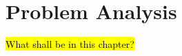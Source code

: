 \newpage
\section{Problem Analysis}

\iffalse
\hl{Content:}
\begin{itemize}
    \item \hl{continuing from Chapter 2 explain the issues}
    \item \hl{outline your solution / extension / refutation}
\end{itemize}

\hl{Limitation of Data Mining Techniques?}\\
\hl{Why EA?}\\
\fi

\hl{What shall be in this chapter?}\\
